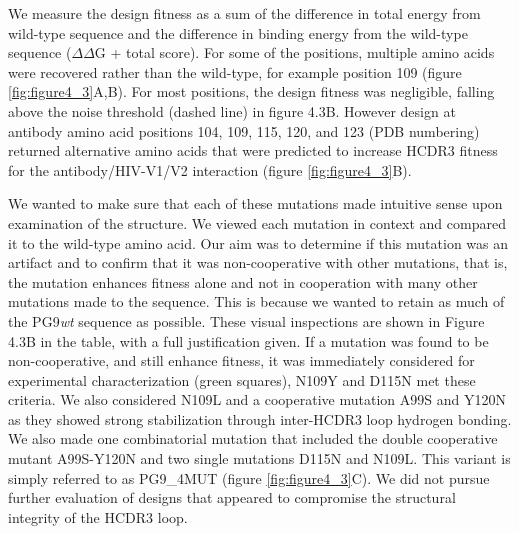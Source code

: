 We measure the design fitness as a sum of the difference in total energy from wild-type sequence and the difference in binding energy from the wild-type sequence ($\Delta\Delta$G + total score). For some of the positions, multiple amino acids were recovered rather than the wild-type, for example position 109 (figure \ref{fig:figure4_3}A,B). For most positions, the design fitness was negligible, falling above the noise threshold (dashed line) in figure 4.3B. However design at antibody amino acid positions 104, 109, 115, 120, and 123 (PDB numbering) returned alternative amino acids that were predicted to increase HCDR3 fitness for the antibody/HIV-V1/V2 interaction (figure \ref{fig:figure4_3}B). 

We wanted to make sure that each of these mutations made intuitive sense upon examination of the structure. We viewed each mutation in context and compared it to the wild-type amino acid. Our aim was to determine if this mutation was an artifact and to confirm that it was non-cooperative with other mutations, that is, the mutation enhances fitness alone and not in cooperation with many other mutations made to the sequence. This is because we wanted to retain as much of the PG9\textit{wt} sequence as possible. These visual inspections are shown in Figure 4.3B in the table, with a full justification given. If a mutation was found to be non-cooperative, and still enhance fitness, it was immediately considered for experimental characterization (green squares), N109Y and D115N met these criteria. We also considered N109L and a cooperative mutation A99S and Y120N as they showed strong stabilization through inter-HCDR3 loop hydrogen bonding. We also made one combinatorial mutation that included the double cooperative mutant A99S-Y120N and two single mutations D115N and N109L. This variant is simply referred to as PG9\_4MUT (figure \ref{fig:figure4_3}C). We did not pursue further evaluation of designs that appeared to compromise the structural integrity of the HCDR3 loop. 

